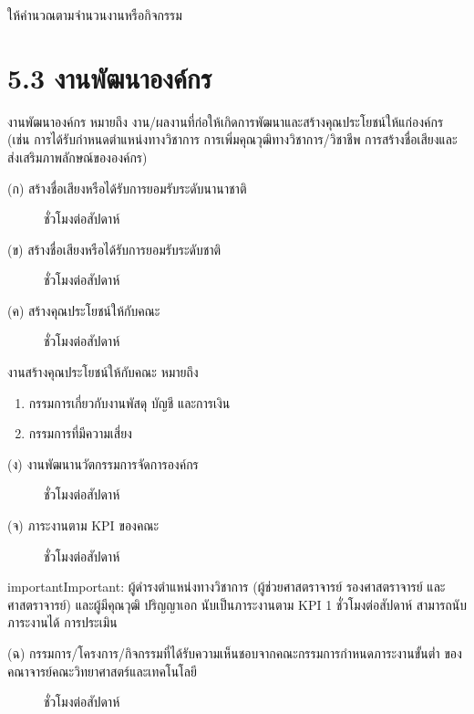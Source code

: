 \documentclass[a4paper,12pt,english]{sphinxmanual}
\begin{document}
ให้คำนวณตามจำนวนงานหรือกิจกรรม


\section{5.3 งานพัฒนาองค์กร}
\label{\detokenize{5etc:id9}}
งานพัฒนาองค์กร หมายถึง งาน/ผลงานที่ก่อให้เกิดการพัฒนาและสร้างคุณประโยชน์ให้แก่องค์กร (เช่น การได้รับกำหนดตำแหน่งทางวิชาการ การเพิ่มคุณวุฒิทางวิชาการ/วิชาชีพ การสร้างชื่อเสียงและส่งเสริมภาพลักษณ์ขององค์กร)
\begin{description}
\item[{(ก) สร้างชื่อเสียงหรือได้รับการยอมรับระดับนานาชาติ}]  ชั่วโมงต่อสัปดาห์

\item[{(ข) สร้างชื่อเสียงหรือได้รับการยอมรับระดับชาติ}]  ชั่วโมงต่อสัปดาห์

\item[{(ค) สร้างคุณประโยชน์ให้กับคณะ}]  ชั่วโมงต่อสัปดาห์

\end{description}

งานสร้างคุณประโยชน์ให้กับคณะ หมายถึง
\begin{enumerate}
%
\item {} 
กรรมการเกี่ยวกับงานพัสดุ บัญชี และการเงิน

\item {} 
กรรมการที่มีความเสี่ยง

\end{enumerate}
\begin{description}
\item[{(ง) งานพัฒนานวัตกรรมการจัดการองค์กร}]  ชั่วโมงต่อสัปดาห์

\item[{(จ) ภาระงานตาม KPI ของคณะ}]  ชั่วโมงต่อสัปดาห์

\end{description}

\begin{sphinxadmonition}{important}{Important:}
ผู้ดำรงตำแหน่งทางวิชาการ (ผู้ช่วยศาสตราจารย์ รองศาสตราจารย์ และศาสตราจารย์) และผู้มีคุณวุฒิ ปริญญาเอก นับเป็นภาระงานตาม KPI 1 ชั่วโมงต่อสัปดาห์ สามารถนับภาระงานได้  การประเมิน
\end{sphinxadmonition}
\begin{description}
\item[{(ฉ) กรรมการ/โครงการ/กิจกรรมที่ได้รับความเห็นชอบจากคณะกรรมการกำหนดภาระงานขั้นต่ำ ของคณาจารย์คณะวิทยาศาสตร์และเทคโนโลยี}]  ชั่วโมงต่อสัปดาห์

\end{description}
\end{document}
